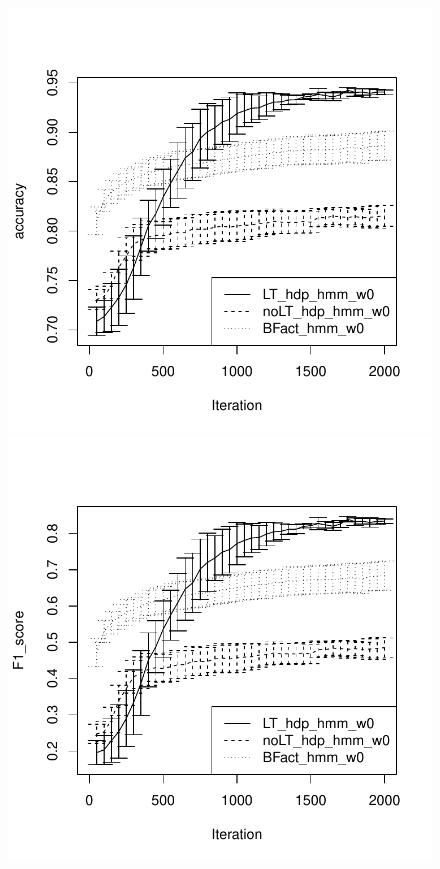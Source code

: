 \begin{figure}[tb]
  \centering
  \begin{minipage}{0.40\textwidth}
  \includegraphics[width = \textwidth]{fig/cocktail_s16_m12/w0/h10.0_nocs_cp1/accuracy.pdf}
\end{minipage}
\hspace{0.1in}
\begin{minipage}{0.40\textwidth}
  \includegraphics[width = \textwidth]{fig/cocktail_s16_m12/w0/h10.0_nocs_cp1/F1_score.pdf}
\end{minipage}
\vspace{-0.3in}


\end{figure}
